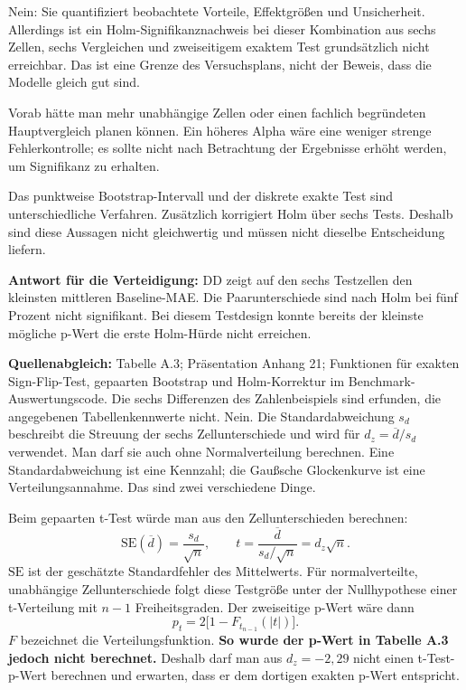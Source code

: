 Nein: Sie quantifiziert beobachtete Vorteile, Effektgrößen und Unsicherheit. Allerdings ist ein Holm-Signifikanznachweis bei dieser Kombination aus sechs Zellen, sechs Vergleichen und zweiseitigem exaktem Test grundsätzlich nicht erreichbar. Das ist eine Grenze des Versuchsplans, nicht der Beweis, dass die Modelle gleich gut sind.

Vorab hätte man mehr unabhängige Zellen oder einen fachlich begründeten Hauptvergleich planen können. Ein höheres Alpha wäre eine weniger strenge Fehlerkontrolle; es sollte nicht nach Betrachtung der Ergebnisse erhöht werden, um Signifikanz zu erhalten.

Das punktweise Bootstrap-Intervall und der diskrete exakte Test sind unterschiedliche Verfahren. Zusätzlich korrigiert Holm über sechs Tests. Deshalb sind diese Aussagen nicht gleichwertig und müssen nicht dieselbe Entscheidung liefern.

\textbf{Antwort für die Verteidigung:} DD zeigt auf den sechs Testzellen den kleinsten mittleren Baseline-MAE. Die Paarunterschiede sind nach Holm bei fünf Prozent nicht signifikant. Bei diesem Testdesign konnte bereits der kleinste mögliche p-Wert die erste Holm-Hürde nicht erreichen.

\textbf{Quellenabgleich:} Tabelle A.3; Präsentation Anhang 21; Funktionen für exakten Sign-Flip-Test, gepaarten Bootstrap und Holm-Korrektur im Benchmark-Auswertungscode. Die sechs Differenzen des Zahlenbeispiels sind erfunden, die angegebenen Tabellenkennwerte nicht.
\clearpage
{}
Nein. Die Standardabweichung $s_d$ beschreibt die Streuung der sechs Zellunterschiede und wird für $d_z=\overline d/s_d$ verwendet. Man darf sie auch ohne Normalverteilung berechnen. Eine Standardabweichung ist eine Kennzahl; die Gaußsche Glockenkurve ist eine Verteilungsannahme. Das sind zwei verschiedene Dinge.

Beim gepaarten t-Test würde man aus den Zellunterschieden berechnen:
\[
\mathrm{SE}(\overline d)=\frac{s_d}{\sqrt n},\qquad
 t=\frac{\overline d}{s_d/\sqrt n}=d_z\sqrt n.
\]
$\mathrm{SE}$ ist der geschätzte Standardfehler des Mittelwerts. Für normalverteilte, unabhängige Zellunterschiede folgt diese Testgröße unter der Nullhypothese einer t-Verteilung mit $n-1$ Freiheitsgraden. Der zweiseitige p-Wert wäre dann
\[
p_t=2\bigl[1-F_{t_{n-1}}(|t|)\bigr].
\]
$F$ bezeichnet die Verteilungsfunktion. \textbf{So wurde der p-Wert in Tabelle A.3 jedoch nicht berechnet.} Deshalb darf man aus $d_z=-2{,}29$ nicht einen t-Test-p-Wert berechnen und erwarten, dass er dem dortigen exakten p-Wert entspricht.

